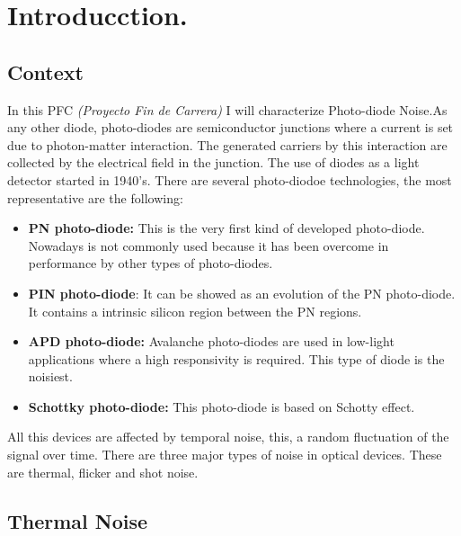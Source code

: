 \chapter{Introducction.}
\label{cap:capitulo_1}
%

\section{Context}

In this PFC \textit{(Proyecto Fin de Carrera)} I will characterize Photo-diode Noise.As any other diode, photo-diodes are semiconductor junctions where a current is set due to photon-matter interaction. The generated carriers by this interaction are collected by the electrical field in the junction. The use of diodes as a light detector started in 1940's.%
There are several photo-diodoe technologies, the most representative are the following:

\begin{itemize}

\item \textbf{PN photo-diode:} This is the very first kind of developed photo-diode. Nowadays is not commonly used because it has been overcome in performance by other types of photo-diodes.   

\item \textbf{PIN photo-diode}: It can be showed as an evolution of the PN photo-diode. It contains a intrinsic silicon region between the PN regions. 

\item \textbf{APD photo-diode:} Avalanche photo-diodes are used in low-light applications where a high responsivity is required. This type of diode is the noisiest.

\item \textbf{Schottky photo-diode:} This photo-diode is based on Schotty effect.
   
\end{itemize}

All this devices are affected by temporal noise, this, a random fluctuation of the signal over time. There are three major types of noise in optical devices. These are thermal, flicker and shot noise.

\section{Thermal Noise}

